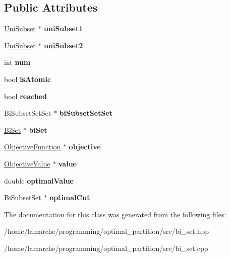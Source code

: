 \subsection*{Public Attributes}
\begin{DoxyCompactItemize}
\item 
\hypertarget{classBiSubset_a77f74c22c4aa92f91bd78308b2226722}{\hyperlink{classUniSubset}{Uni\-Subset} $\ast$ {\bfseries uni\-Subset1}}\label{classBiSubset_a77f74c22c4aa92f91bd78308b2226722}

\item 
\hypertarget{classBiSubset_ac457d4d17b160513bdbb0ebd0e953e98}{\hyperlink{classUniSubset}{Uni\-Subset} $\ast$ {\bfseries uni\-Subset2}}\label{classBiSubset_ac457d4d17b160513bdbb0ebd0e953e98}

\item 
\hypertarget{classBiSubset_a2c5e87f3e494ab45378f4a164067b593}{int {\bfseries num}}\label{classBiSubset_a2c5e87f3e494ab45378f4a164067b593}

\item 
\hypertarget{classBiSubset_ab99e33ac14000f58d9857ed350b22945}{bool {\bfseries is\-Atomic}}\label{classBiSubset_ab99e33ac14000f58d9857ed350b22945}

\item 
\hypertarget{classBiSubset_a62f9d6c80da8a1c1042cf7fc62c2fd74}{bool {\bfseries reached}}\label{classBiSubset_a62f9d6c80da8a1c1042cf7fc62c2fd74}

\item 
\hypertarget{classBiSubset_ae7762449606cb0881912516b860c02af}{Bi\-Subset\-Set\-Set $\ast$ {\bfseries bi\-Subset\-Set\-Set}}\label{classBiSubset_ae7762449606cb0881912516b860c02af}

\item 
\hypertarget{classBiSubset_a1032827bad10a9ecca017392a748b7fa}{\hyperlink{classBiSet}{Bi\-Set} $\ast$ {\bfseries bi\-Set}}\label{classBiSubset_a1032827bad10a9ecca017392a748b7fa}

\item 
\hypertarget{classBiSubset_a7ef49d4b3b6d7af08a01602a0edf34b8}{\hyperlink{classObjectiveFunction}{Objective\-Function} $\ast$ {\bfseries objective}}\label{classBiSubset_a7ef49d4b3b6d7af08a01602a0edf34b8}

\item 
\hypertarget{classBiSubset_a9db1dc5225f9f61d579dbef600d567b8}{\hyperlink{classObjectiveValue}{Objective\-Value} $\ast$ {\bfseries value}}\label{classBiSubset_a9db1dc5225f9f61d579dbef600d567b8}

\item 
\hypertarget{classBiSubset_adf8bd52488fe0c1aae0b6c32a6dac812}{double {\bfseries optimal\-Value}}\label{classBiSubset_adf8bd52488fe0c1aae0b6c32a6dac812}

\item 
\hypertarget{classBiSubset_a0cd31189cc46810f4c753ab12ebb4d47}{Bi\-Subset\-Set $\ast$ {\bfseries optimal\-Cut}}\label{classBiSubset_a0cd31189cc46810f4c753ab12ebb4d47}

\end{DoxyCompactItemize}


The documentation for this class was generated from the following files\-:\begin{DoxyCompactItemize}
\item 
/home/lamarche/programming/optimal\-\_\-partition/src/bi\-\_\-set.\-hpp\item 
/home/lamarche/programming/optimal\-\_\-partition/src/bi\-\_\-set.\-cpp\end{DoxyCompactItemize}
